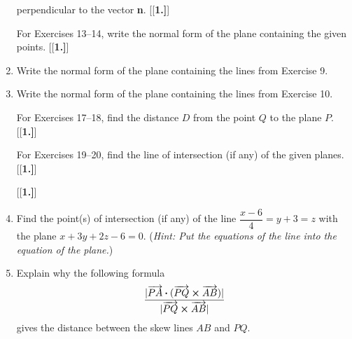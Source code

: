 \begin{enumerate}[\bfseries 1.]
perpendicular to the vector \textbf{n}.
[{[\bfseries 1.]}]
\par\noindent For Exercises 13--14, write the normal form of the plane containing the given points.
[{[\bfseries 1.]}]
 \item Write the normal form of the plane containing the lines from Exercise 9.
 \item Write the normal form of the plane containing the lines from Exercise 10.
\par\noindent For Exercises 17--18, find the distance $D$ from the point $Q$ to the plane $P$.
[{[\bfseries 1.]}]
\par\noindent For Exercises 19--20, find the line of intersection (if any) of the given planes.
[{[\bfseries 1.]}]
[{[\bfseries 1.]}]
 \item Find the point(s) of intersection (if any) of the line $\dfrac{x - 6}{4} = y + 3 = z$ with the plane
 $x + 3y + 2z - 6 = 0$. (\emph{Hint: Put the equations of the line into the equation of the plane.})
\item Explain why the following formula 
\[\frac{|\overrightarrow{PA} \bm{\cdot} (\overrightarrow{PQ} \bm{\times} \overrightarrow{AB})|}{|{\overrightarrow{PQ} \bm{\times} \overrightarrow{AB}}|}\]
gives the distance between the skew lines $AB$ and $PQ$.
\end{enumerate}



